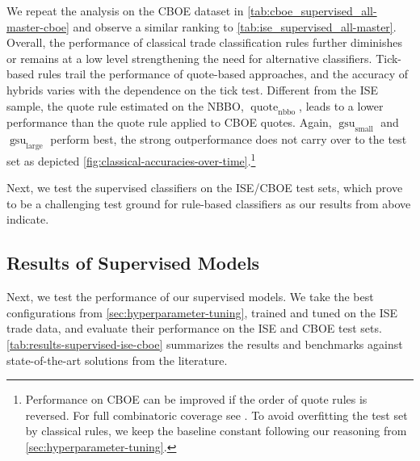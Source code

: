 We repeat the analysis on the \gls{CBOE} dataset in \cref{tab:cboe_supervised_all-master-cboe} and observe a similar ranking to \cref{tab:ise_supervised_all-master}. Overall, the performance of classical trade classification rules further diminishes or remains at a low level strengthening the need for alternative classifiers. Tick-based rules trail the performance of quote-based approaches, and the accuracy of hybrids varies with the dependence on the tick test. Different from the \gls{ISE} sample, the quote rule estimated on the \gls{NBBO}, $\operatorname{quote}_{\mathrm{nbbo}}$, leads to a lower performance than the quote rule applied to \gls{CBOE} quotes.
Again, $\operatorname{gsu}_{\mathrm{small}}$ and $\operatorname{gsu}_{\mathrm{large}}$ perform best, the strong outperformance does not carry over to the test set as depicted \cref{fig:classical-accuracies-over-time}.\footnote{Performance on \gls{CBOE} can be improved if the order of quote rules is reversed. For full combinatoric coverage see \textcite[][33]{grauerOptionTradeClassification2022}. To avoid overfitting the test set by classical rules, we keep the baseline constant following our reasoning from \cref{sec:hyperparameter-tuning}.}


Next, we test the supervised classifiers on the \gls{ISE}/\gls{CBOE} test sets, which prove to be a challenging test ground for rule-based classifiers as our results from above indicate.

\subsection{Results of Supervised
    Models}\label{sec:results-of-supervised-models}

Next, we test the performance of our supervised models. We take the best configurations from \cref{sec:hyperparameter-tuning}, trained and tuned on the \gls{ISE} trade data, and evaluate their performance on the \gls{ISE} and \gls{CBOE} test sets. \cref{tab:results-supervised-ise-cboe} summarizes the results and benchmarks against state-of-the-art solutions from the literature.

